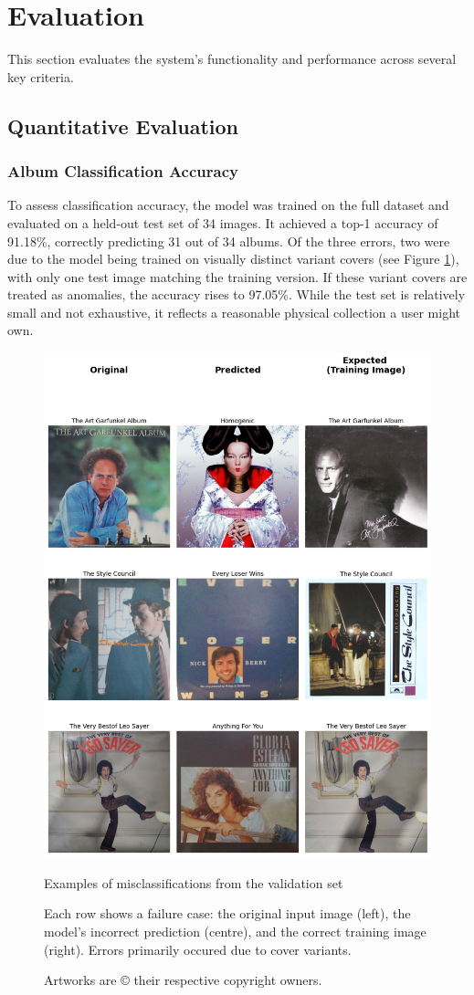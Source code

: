     \section{Evaluation}
    
        This section evaluates the system’s functionality and performance across several key criteria.
        
        \subsection{Quantitative Evaluation}
    
            \subsubsection{Album Classification Accuracy}
    
                To assess classification accuracy, the model was trained on the full dataset and evaluated on a held-out test set of 34 images. It achieved a top-1 accuracy of 91.18\%, correctly predicting 31 out of 34 albums. Of the three errors, two were due to the model being trained on visually distinct variant covers (see Figure \ref{fig:ModelEval}), with only one test image matching the training version. If these variant covers are treated as anomalies, the accuracy rises to 97.05\%. While the test set is relatively small and not exhaustive, it reflects a reasonable physical collection a user might own.
    
                \begin{figure}
                    \centering
                    \includegraphics[width=0.5\linewidth]{images/modelEval.png}
                    \caption{Examples of misclassifications from the validation set}
                    \caption*{
                        Each row shows a failure case: the original input image (left), the model’s incorrect prediction (centre), and the correct training image (right). Errors primarily occured due to cover variants.
                    }
                    \caption*{
                        Artworks are © their respective copyright owners.
                    }
                    \label{fig:ModelEval}
                \end{figure}
    
